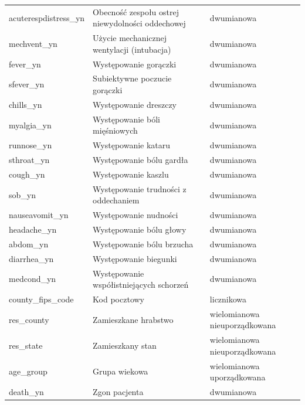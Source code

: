 \documentclass[polish, twoside, 12pt, a4paper]{article}
\theoremstyle{definition}
\theoremstyle{plain}
\theoremstyle{remark}
\begin{document}
\begin{landscape}
{\begin{longtable}{lll}
acuterespdistress\_yn     & Obecność zespołu ostrej niewydolności oddechowej     & dwumianowa                    \\
mechvent\_yn              & Użycie mechanicznej wentylacji (intubacja)           & dwumianowa                    \\
fever\_yn                 & Występowanie gorączki                                & dwumianowa                    \\
sfever\_yn                & Subiektywne poczucie gorączki                        & dwumianowa                    \\
chills\_yn                & Występowanie dreszczy                                & dwumianowa                    \\
myalgia\_yn               & Występowanie bóli mięśniowych                        & dwumianowa                    \\
runnose\_yn               & Występowanie kataru                                  & dwumianowa                    \\
sthroat\_yn               & Występowanie bólu gardła                             & dwumianowa                    \\
cough\_yn                 & Występowanie kaszlu                                  & dwumianowa                    \\
sob\_yn                   & Występowanie trudności z oddechaniem                 & dwumianowa                    \\
nauseavomit\_yn           & Występowanie nudności                                & dwumianowa                    \\
headache\_yn              & Występowanie bólu głowy                              & dwumianowa                    \\
abdom\_yn                 & Występowanie bólu brzucha                            & dwumianowa                    \\
diarrhea\_yn              & Występowanie biegunki                                & dwumianowa                    \\
medcond\_yn               & Występowanie współistniejących schorzeń              & dwumianowa                    \\
county\_fips\_code        & Kod pocztowy                                         & licznikowa                    \\
res\_county               & Zamieszkane hrabstwo                                 & wielomianowa nieuporządkowana \\
res\_state                & Zamieszkany stan                                     & wielomianowa nieuporządkowana \\
age\_group                & Grupa wiekowa                                        & wielomianowa uporządkowana    \\
death\_yn                 & Zgon pacjenta                                        & dwumianowa                    \\
 \hline
\end{longtable}


}
\end{landscape}
\end{document}
